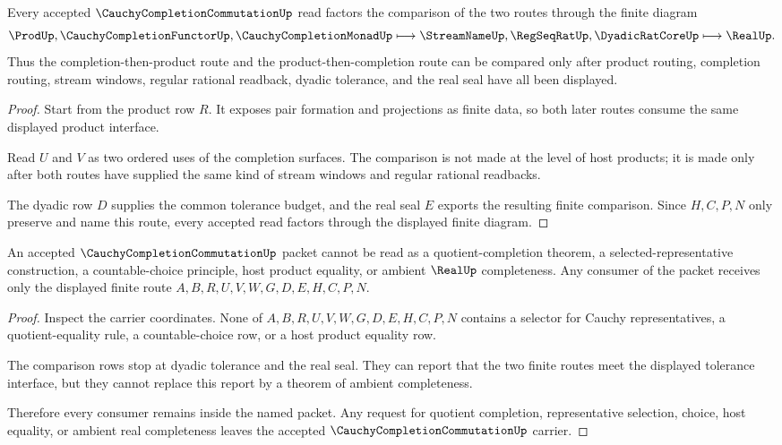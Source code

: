 \begin{theorem}
\label{thm:cauchy-completion-commutation-finite-route}
Every accepted $\CauchyCompletionCommutationUp$ read factors the comparison of the two routes through the finite diagram
$$
\ProdUp,\CauchyCompletionFunctorUp,\CauchyCompletionMonadUp \longmapsto \StreamNameUp,\RegSeqRatUp,\DyadicRatCoreUp \longmapsto \RealUp .
$$
Thus the completion-then-product route and the product-then-completion route can be compared only after product routing, completion routing, stream windows, regular rational readback, dyadic tolerance, and the real seal have all been displayed.
\end{theorem}
\begin{proof}
Start from the product row $R$. It exposes pair formation and projections as finite data, so both later routes consume the same displayed product interface.

Read $U$ and $V$ as two ordered uses of the completion surfaces. The comparison is not made at the level of host products; it is made only after both routes have supplied the same kind of stream windows and regular rational readbacks.

The dyadic row $D$ supplies the common tolerance budget, and the real seal $E$ exports the resulting finite comparison. Since $H,C,P,N$ only preserve and name this route, every accepted read factors through the displayed finite diagram.
\end{proof}

\begin{theorem}
\label{thm:cauchy-completion-commutation-nonescape}
An accepted $\CauchyCompletionCommutationUp$ packet cannot be read as a quotient-completion theorem, a selected-representative construction, a countable-choice principle, host product equality, or ambient $\RealUp$ completeness. Any consumer of the packet receives only the displayed finite route $A,B,R,U,V,W,G,D,E,H,C,P,N$.
\end{theorem}
\begin{proof}
Inspect the carrier coordinates. None of $A,B,R,U,V,W,G,D,E,H,C,P,N$ contains a selector for Cauchy representatives, a quotient-equality rule, a countable-choice row, or a host product equality row.

The comparison rows stop at dyadic tolerance and the real seal. They can report that the two finite routes meet the displayed tolerance interface, but they cannot replace this report by a theorem of ambient completeness.

Therefore every consumer remains inside the named packet. Any request for quotient completion, representative selection, choice, host equality, or ambient real completeness leaves the accepted $\CauchyCompletionCommutationUp$ carrier.
\end{proof}

